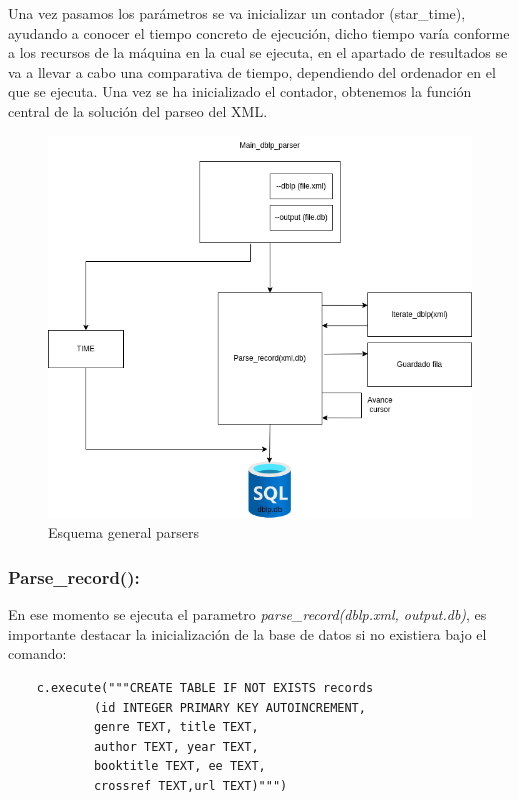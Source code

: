 \documentclass[a4paper, 12pt]{book}
\begin{document}
Una vez pasamos los parámetros se va inicializar un contador (star\_time), ayudando a conocer el tiempo concreto de ejecución, dicho tiempo varía conforme a los recursos de la máquina en la cual se ejecuta, en el apartado de resultados se va a llevar a cabo una comparativa de tiempo, dependiendo del ordenador en el que se ejecuta. 
Una vez se ha inicializado el contador, obtenemos la función central de la solución del parseo del XML. 

\begin{figure}[h]
  \centering
  \includegraphics[width=15cm, keepaspectratio]{img/main_dblp_parser_par.png}
  \caption{Esquema general parsers}
  \label{fig:dblp_parser}
\end{figure}

\subsubsection{Parse\_record():}

En ese momento se ejecuta el parametro \textit{parse\_record(dblp.xml, output.db)}, es importante destacar la inicialización de la base de datos si no existiera bajo el comando: 

\begin{verbatim}
    c.execute("""CREATE TABLE IF NOT EXISTS records
            (id INTEGER PRIMARY KEY AUTOINCREMENT, 
            genre TEXT, title TEXT,
            author TEXT, year TEXT, 
            booktitle TEXT, ee TEXT, 
            crossref TEXT,url TEXT)""")
\end{verbatim}
\end{document}
